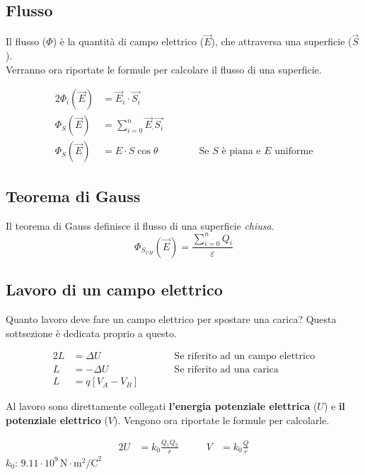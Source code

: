 \subsection{Flusso} \label{subsec:flusso}
Il flusso ($\Phi$) è la quantità di campo elettrico ($\vec{E}$), che 
attraversa una superficie ($\vec{S}$).\\
Verranno ora riportate le formule per calcolare il flusso di una superficie.

\begin{alignat*}{2}
\Phi_i\left(\vec{E}\right) &= \vec{E}_i \cdot \vec{S_i} &\qquad &\\
\Phi_S\left(\vec{E}\right) &= \sum\limits_{i=0}^{n}\vec{E}_\cdot\vec{S_i} & &\\
\Phi_S\left(\vec{E}\right) &= E\cdot S\cos\theta & &\text{Se } S \text{ è piana e } E \text{ 
uniforme} 
\end{alignat*}

\subsection{Teorema di Gauss}
Il teorema di Gauss definisce il flusso di una superficie \emph{chiusa}.
\begin{equation*}
\Phi_{S_{CH}}\left(\vec{E}\right) = \frac{\sum\limits_{i=0}^{n}Q_i}{\varepsilon}
\end{equation*}

\subsection{Lavoro di un campo elettrico}
Quanto lavoro deve fare un campo elettrico per spostare una carica? Questa sottsezione è dedicata 
proprio a questo.

\begin{alignat*}{2}
L &= \Delta U &\qquad  &\text{Se riferito ad un campo elettrico}\\
L &= -\Delta U & &\text{Se riferito ad una carica}\\
L &= q\left[V_A - V_B\right] & &
\end{alignat*}

Al lavoro sono direttamente collegati \textbf{l'energia potenziale elettrica} ($U$) e 
\textbf{il potenziale elettrico} ($V$). Vengono ora riportate le formule per calcolarle.

\begin{alignat*}{2}
U &= k_0\frac{Q_1Q_2}{r} &\qquad V &= k_0\frac{Q}{r}
\end{alignat*}
\hyperref[tab:k0]{$k_0$}: $9.11\cdot10^9\,\text{N}\cdot\text{m}^2\text{/C}^2$

